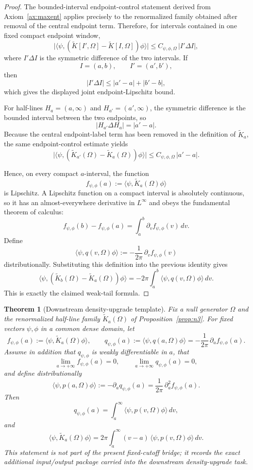\documentclass[11pt]{article}
\newtheorem{theorem}{Theorem}[section]
\begin{document}
\begin{proof}
The bounded-interval endpoint-control statement derived from Axiom~\ref{ax:maxent} applies precisely to the renormalized family obtained after removal of the central endpoint term. Therefore, for intervals contained in one fixed compact endpoint window,
\[
\bigl|\langle\psi,(\widetilde K[I',\Omega]-\widetilde K[I,\Omega])\phi\rangle\bigr|
\le
C_{\psi,\phi,\Omega}\,|I'\Delta I|,
\]
where \(I'\Delta I\) is the symmetric difference of the two intervals. If
\[
I=(a,b),\qquad I'=(a',b'),
\]
then
\[
|I'\Delta I|
\le
|a'-a|+|b'-b|,
\]
which gives the displayed joint endpoint-Lipschitz bound.

For half-lines \(H_a=(a,\infty)\) and \(H_{a'}=(a',\infty)\), the symmetric difference is the bounded interval between the two endpoints, so
\[
|H_{a'}\Delta H_a|=|a'-a|.
\]
Because the central endpoint-label term has been removed in the definition of \(\widetilde K_a\), the same endpoint-control estimate yields
\[
\bigl|\langle\psi,(\widetilde K_{a'}(\Omega)-\widetilde K_a(\Omega))\phi\rangle\bigr|
\le
C_{\psi,\phi,\Omega}\,|a'-a|.
\]

Hence, on every compact \(a\)-interval, the function
\[
f_{\psi,\phi}(a):=\langle\psi,\widetilde K_a(\Omega)\phi\rangle
\]
is Lipschitz. A Lipschitz function on a compact interval is absolutely continuous, so it has an almost-everywhere derivative in \(L^\infty\) and obeys the fundamental theorem of calculus:
\[
f_{\psi,\phi}(b)-f_{\psi,\phi}(a)=\int_a^b \partial_v f_{\psi,\phi}(v)\,dv.
\]
Define
\[
\langle\psi,q(v,\Omega)\phi\rangle
:=
-\frac{1}{2\pi}\,\partial_v f_{\psi,\phi}(v)
\]
distributionally. Substituting this definition into the previous identity gives
\[
\langle\psi,(\widetilde K_b(\Omega)-\widetilde K_a(\Omega))\phi\rangle
=
-2\pi\int_a^b \langle\psi,q(v,\Omega)\phi\rangle\,dv.
\]
This is exactly the claimed weak-tail formula.
\end{proof}

\begin{theorem}[Downstream density-upgrade template]\label{lem:density}
Fix a null generator \(\Omega\) and the renormalized half-line family \(\widetilde K_a(\Omega)\) of Proposition~\ref{prop:n3}. For fixed vectors \(\psi,\phi\) in a common dense domain, let
\[
f_{\psi,\phi}(a):=\langle\psi,\widetilde K_a(\Omega)\phi\rangle,
\qquad
q_{\psi,\phi}(a):=\langle\psi,q(a,\Omega)\phi\rangle
=
-\frac{1}{2\pi}\,\partial_a f_{\psi,\phi}(a).
\]
Assume in addition that \(q_{\psi,\phi}\) is weakly differentiable in \(a\), that
\[
\lim_{a\to+\infty} f_{\psi,\phi}(a)=0,
\qquad
\lim_{a\to+\infty} q_{\psi,\phi}(a)=0,
\]
and define distributionally
\[
\langle\psi,p(a,\Omega)\phi\rangle
:=
-\partial_a q_{\psi,\phi}(a)
=
\frac{1}{2\pi}\,\partial_a^2 f_{\psi,\phi}(a).
\]
Then
\[
q_{\psi,\phi}(a)
=
\int_a^\infty \langle\psi,p(v,\Omega)\phi\rangle\,dv,
\]
and
\[
\langle\psi,\widetilde K_a(\Omega)\phi\rangle
=
2\pi\int_a^\infty (v-a)\,\langle\psi,p(v,\Omega)\phi\rangle\,dv.
\]
This statement is not part of the present fixed-cutoff bridge; it records the exact additional input/output package carried into the downstream density-upgrade task.
\end{theorem}
\end{document}
